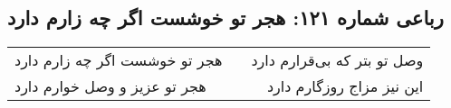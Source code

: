 \begin{center}
\section*{رباعی شماره ۱۲۱: هجر تو خوشست اگر چه زارم دارد}
\label{sec:sh121}
\begin{longtable}{l p{0.5cm} r}
هجر تو خوشست اگر چه زارم دارد
&&
وصل تو بتر که بی‌قرارم دارد
\\
هجر تو عزیز و وصل خوارم دارد
&&
این نیز مزاج روزگارم دارد
\\
\end{longtable}
\end{center}

